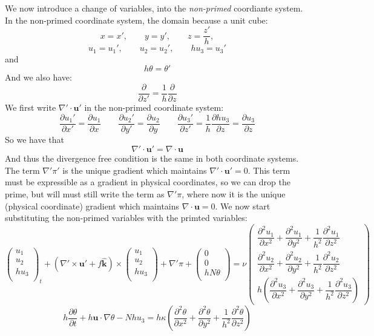 \documentclass[12pt]{article}
\newcommand{\khat}{\hat{\mathbf k}}
\newcommand{\uv}{\mathbf u}
\newcommand{\up}{\mathbf u'}
\newcommand{\grad}{\nabla}
\newcommand{\curlp}{\gradp \times}
\newcommand{\gradp}{\nabla'}
\begin{document}
We now introduce a change of variables, into the {\em non-primed} coordiante
system.  In the non-primed coordinate system, the domain because a 
unit cube:
\[
x = x', \qquad y=y', \qquad  z = \frac{z'}{h},
\]
\[
u_1 = u_1', \qquad u_2 = u_2', \qquad  h u_3 = u_3'
\]
and
\[
h \theta = \theta'
\]
And we also have:
\[
\frac{\partial}{\partial z'} = \frac{1}{h} \frac{\partial}{\partial z}
\]
We first write $\gradp \cdot \up$ in the non-primed coordinate system:
\[
\frac{\partial u_1' }{\partial x'} = \frac{\partial u_1 }{\partial x}
\qquad
\frac{\partial u_2' }{\partial y'} = \frac{\partial u_2 }{\partial y}
\qquad
\frac{\partial u_3' }{\partial z'} = \frac{1}{h} \frac{\partial h u_3 }{\partial z}
= \frac{\partial u_3 }{\partial z}
\]
So we have that
\[
\gradp \cdot \up = \grad \cdot \uv
\]
And thus the divergence free condition is the 
same in both coordinate systems.  The term $\gradp \pi'$ is the
unique gradient which maintains $\gradp \cdot \up = 0$.  This
term must be expressible as a gradient in physical coordinates,
so we can drop the prime, but will must still write the term as
$\gradp \pi$, where now it is the unique (physical coordinate) 
gradient which maintains  $\grad \cdot \uv = 0$.
We now start substituting the non-primed variables with the
primted variables:
\[
\begin{pmatrix} u_1 \\
                u_2 \\
                h u_3 \\
\end{pmatrix}_t
  + (\curlp \up + f \khat) \times 
\begin{pmatrix} u_1 \\
                u_2 \\
                h u_3 \\
\end{pmatrix}
+ \gradp \pi +
\begin{pmatrix} 0 \\
                0 \\
                h N \theta \\
\end{pmatrix}
= \nu 
\begin{pmatrix} \dfrac{\partial^2 u_1}{\partial x^2} + 
                \dfrac{\partial^2 u_1}{\partial y^2} + 
                \dfrac{1}{h^2}\dfrac{\partial^2 u_1}{\partial z^2}   \\[5mm]
                \dfrac{\partial^2 u_2}{\partial x^2} + 
                \dfrac{\partial^2 u_2}{\partial y^2} + 
                \dfrac{1}{h^2}\dfrac{\partial^2 u_2}{\partial z^2}   \\[5mm]
                h \left( 
                \dfrac{\partial^2 u_3}{\partial x^2} + 
                \dfrac{\partial^2 u_3}{\partial y^2} + 
                \dfrac{1}{h^2}\dfrac{\partial^2 u_3}{\partial z^2} \right)
\end{pmatrix}
\]
\[
h \frac{ \partial  \theta }{\partial t}  + h \uv \cdot \grad \theta - 
N h u_3  = h \kappa \left(
                \dfrac{\partial^2 \theta}{\partial x^2} + 
                \dfrac{\partial^2 \theta}{\partial y^2} + 
                \dfrac{1}{h^2}\dfrac{\partial^2 \theta}{\partial z^2}
\right)
\]
\end{document}
